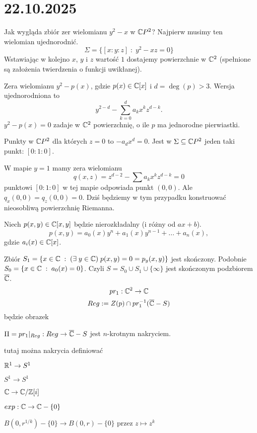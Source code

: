 \section{22.10.2025}{}

\begin{example}[m]
  \item Jak wygląda zbiór zer wielomianu $y^2-x$ w $\mathbb{C} P^2$? Najpierw musimy ten wielomian ujednorodnić.
    $$\Sigma=\{[x:y:z]\;:\;y^2-xz=0\}$$
    Wstawiając w kolejno $x$, $y$ i $z$ wartość $1$ dostajemy powierzchnie w $\mathbb{C}^2$ (spełnione są założenia twierdzenia o funkcji uwikłanej).
  \item Zera wielomianu $y^2-p(x)$, gdzie $p(x)\in\mathbb{C}[x]$ i $d=\deg(p)>3$.
    Wersja ujednorodniona to
    $$y^{2-d}-\sum_{k=0}^da_kx^kz^{d-k}.$$
    $y^2-p(x)=0$ zadaje w $\mathbb{C}^2$ powierzchnię, o ile $p$ ma jednorodne pierwiastki. 

    Punkty w $\mathbb{C} P^2$ dla których $z=0$ to $-a_dx^d=0$. Jest w $\Sigma\subseteq \mathbb{C} P^2$ jeden taki punkt: $[0:1:0]$.

    W mapie $y=1$ mamy zera wielomianu
    $$q(x,z)=z^{d-2}-\sum a_kx^kz^{d-k}=0$$
    punktowi $[0:1:0]$ w tej mapie odpowiada punkt $(0,0)$. Ale $q_x(0,0)=q_z(0,0)=0$. Dziś będziemy w tym przypadku konstruować nieosobliwą powierzchnię Riemanna.
\end{example}

Niech $p(x,y)\in\mathbb{C}[x,y]$ będzie nierozkładalny (i różny od $ax+b$).
$$p(x,y)=a_0(x)y^n+a_1(x)y^{n-1}+...+a_n(x),$$
gdzie $a_i(x)\in\mathbb{C}[x]$.

Zbiór $S_1=\{x\in \mathbb{C}\;:\;(\exists\;y\in\mathbb{C})\;p(x,y)=0=p_y(x,y)\}$
jest skończony. Podobnie $S_0=\{x\in\mathbb{C}\;:\;a_0(x)=0\}$. Czyli $S=S_0\cup S_1\cup\{\infty\}$ jest skończonym podzbiorem $\overline{\mathbb{C}}$.
$$pr_1:\mathbb{C}^2\to\mathbb{C}$$
$$Reg:=Z(p)\cap pr_1^{-1}(\overline{\mathbb{C}}-S)$$
będzie obrazek

\begin{fact}{}{}
  $\Pi=pr_1|_{Reg}:Reg\to\overline{\mathbb{C}}-S$ jest $n$-krotnym nakryciem.
\end{fact}

\begin{definition}{}{}
  tutaj można nakrycia definiować
\end{definition}

\begin{example}[m]
  \item $\mathbb{R}^1\to S^1$
  \item $S^1\to S^1$
  \item $\mathbb{C}\to\mathbb{C}/\mathbb{Z}[i]$
  \item $exp:\mathbb{C}\to\mathbb{C}-\{0\}$
  \item $B(0, r^{1/k})-\{0\}\to B(0,r)-\{0\}$ przez $z\mapsto z^k$
\end{example}


